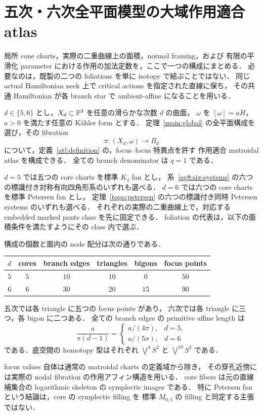 \section{五次・六次全平面模型の大域作用適合 atlas}
\label{ga8:section}

局所 cone charts，実際の二重曲線上の面積，normal framing，および
有限の平滑化 parameter における作用の加法定数を，ここで一つの構成にまとめる．
必要なのは，既製の二つの foliations を単に isotopy で結ぶことではない．
同じ actual Hamiltonian neck 上で critical actions を指定された直線に保ち，
その共通 Hamiltonian が各 branch star で ambient-affine になることを用いる．

\begin{theorem}
\label{ga8:global}
$d\in\{5,6\}$ とし，$X_d\subset\mathbb P^3$ を任意の滑らかな次数 $d$ の曲面，
$\omega$ を $[\omega]=aH$，$a>0$ を満たす任意の K\"ahler form とする．
定理~\ref{main:global} の全平面構成を選び，その fibration
\[
 \pi:(X_d,\omega)\longrightarrow B_d
\]
について，定義~\ref{atl:definition} の，focus--focus 特異点を許す
作用適合 matroidal atlas を構成できる．
全ての branch denominator は $q=1$ である．

$d=5$ では五つの core charts を標準 $K_4$ fan とし，
系~\ref{qg8:six-systems} の六つの標識付き対称有向四角形系のいずれも選べる．
$d=6$ では六つの core charts を標準 Petersen fan とし，
定理~\ref{topo:petersen} の六つの標識付き同時 Petersen systems のいずれも選べる．
それぞれの実際の二重曲線上で，対応する embedded marked pants class を先に固定できる．
foliation の代表は，以下の面積条件を満たすようにその class 内で選ぶ．

構成の個数と面内の node 配分は次の通りである．
\begin{center}
\begin{tabular}{c|ccccc}
 $d$ & cores & branch edges & triangles & bigons & focus points\\ \hline
 $5$ & $5$ & $10$ & $10$ & $0$ & $50$\\
 $6$ & $6$ & $30$ & $20$ & $15$ & $90$
\end{tabular}
\end{center}
五次では各 triangle に五つの focus points があり，
六次では各 triangle に三つ，各 bigon に二つある．
全ての branch edges の primitive affine length は
\begin{equation}\label{ga8:branch-length}
 \frac{a}{\pi(d-1)}
 =\begin{cases}a/(4\pi),&d=5,\\a/(5\pi),&d=6\end{cases}
\end{equation}
である．底空間の homotopy 型はそれぞれ
$\bigvee^4S^2$ と $\bigvee^{10}S^2$ である．

focus values 自体は通常の matroidal charts の定義域から除き，
その穿孔近傍には実際の nodal fibration の作用アフィン構造を用いる．
core fibers は元の直線補集合の logarithmic skeleton の symplectic images である．
特に Petersen fan という結論は，core の symplectic filling を
標準 $M_{0,5}$ の filling と同定する主張ではない．
\end{theorem}

